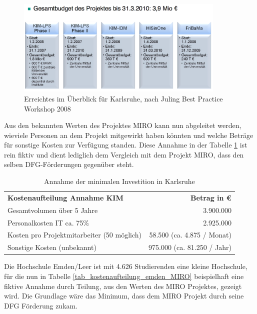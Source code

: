 \begin{figure}[h!]
	\centering
	\includegraphics[width=10cm]{kapitel/gruppe4_2/bilder/uberblick_projekt_KIM}
	\caption{Erreichtes im Überblick für Karlsruhe, nach Juling Best Practice Workshop 2008}
	\label{fig_uberblick_projekt_KIM}
\end{figure}

Aus den bekannten Werten des Projektes MIRO kann nun abgeleitet werden, wieviele Personen an dem Projekt mitgewirkt haben könnten und welche Beträge für sonstige Kosten zur Verfügung standen. Diese Annahme in der Tabelle \ref{tab_minimale_investition_karlsruhe} ist rein fiktiv und dient lediglich dem Vergleich mit dem Projekt MIRO, dass den selben DFG-Förderungen gegenüber steht.

\begin{table}[h!]
	\begin{tabularx}{\textwidth}{l|r}
		\hline
		\textbf{Kostenaufteilung Annahme KIM} & \textbf{Betrag in \euro}\\
		Gesamtvolumen über 5 Jahre & 3.900.000\\
		Personalkosten IT ca. 75\% & 2.925.000\\
		Kosten pro Projektmitarbeiter (50 möglich) & 58.500 (ca. 4.875 / Monat)\\ 
		Sonstige Kosten (unbekannt) & 975.000 (ca. 81.250 / Jahr)\\
		\hline
	\end{tabularx}
	\caption{Annahme der minimalen Investition in Karlsruhe}
	\label{tab_minimale_investition_karlsruhe}
\end{table}

Die Hochschule Emden/Leer ist mit 4.626 Studierenden eine kleine Hochschule, für die nun in Tabelle \ref{tab_kostenaufteilung_emden_MIRO} beispielhaft eine fiktive Annahme durch Teilung, aus den Werten des MIRO Projektes, gezeigt wird. Die Grundlage wäre das Minimum, dass dem MIRO Projekt durch seine DFG Förderung zukam.

